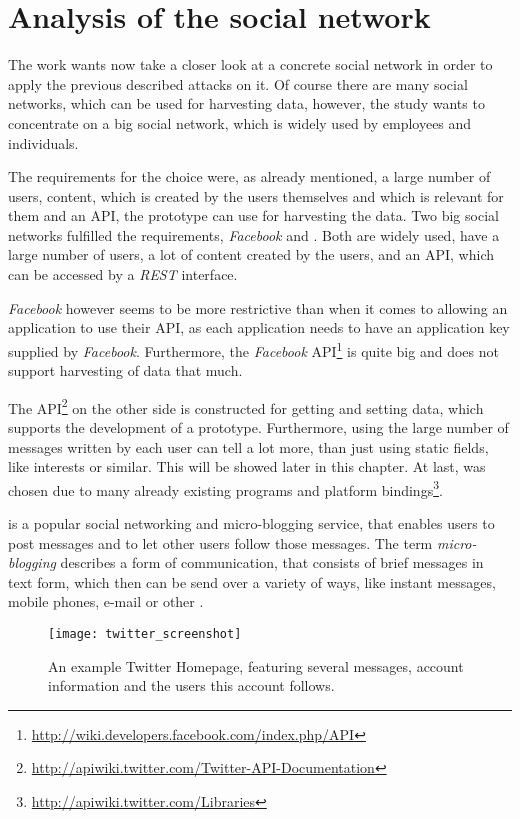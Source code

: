 \chapter{Analysis of the social network \Twitter}
\label{chapter:analysis}

The work wants now take a closer look at a concrete social network in order to
apply the previous described attacks on it.  Of course there are many social
networks, which can be used for harvesting data, however, the study wants to
concentrate on a big social network, which is widely used by employees and
individuals.

The requirements for the choice were, as already mentioned, a large number of
users, content, which is created by the users themselves and which is
relevant for them and an API, the prototype can use for harvesting the data.
Two big social networks fulfilled the requirements, \textit{Facebook} and \Twitter. Both are
widely used, have a large number of users, a lot of content created by the
users, and an API, which can be accessed by a \textit{REST} interface.

\textit{Facebook} however seems to be more restrictive than \Twitter{} when it
comes to allowing an application to use their API, as each application needs to
have an application key supplied by \textit{Facebook}. Furthermore, the
\textit{Facebook}
API\footnote{\url{http://wiki.developers.facebook.com/index.php/API}} is quite
big and does not support harvesting of data that much.

The \Twitter{}
API\footnote{\url{http://apiwiki.twitter.com/Twitter-API-Documentation}} on the
other side is constructed for getting and setting data, which supports the
development of a prototype. Furthermore, using the large number of messages
written by each \Twitter{} user can tell a lot more, than just using static
fields, like interests or similar. This will be showed later in this chapter.
At last, \Twitter{} was chosen due to many already existing programs and
platform bindings\footnote{\url{http://apiwiki.twitter.com/Libraries}}.

\Twitter{} is a popular social networking and micro-blogging service, that
enables users to post messages and to let other users follow those messages.
The term \textit{micro-blogging} describes a form of communication, that
consists of brief messages in text form, which then can be send over a variety
of ways, like instant messages, mobile phones, e-mail or other \cite{java2007}.

\begin{figure}[hbt]
  \centering
  \texttt{[image: twitter\_screenshot]}
  \caption{An example Twitter Homepage, featuring several \Twitter{}
  messages, account information and the users this account
  follows.}\label{fig:twitter_screenshot}
\end{figure}

